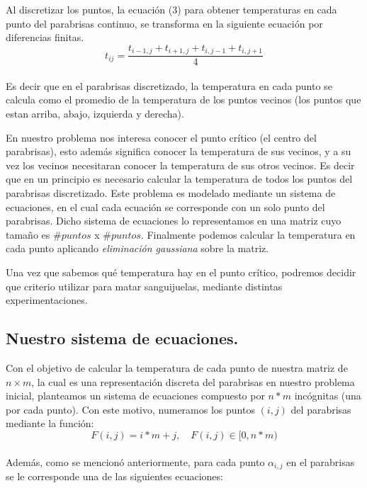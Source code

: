 \documentclass{article}
\begin{document}
Al discretizar los puntos, la ecuación (3) para obtener temperaturas en cada punto del parabrisas continuo, se transforma en la siguiente ecuación por diferencias finitas.
\begin{equation}
t_{ij} = \frac{t_{i-1,j} + t_{i+1,j} + t_{i,j-1} + t_{i,j+1}}{4}
\end{equation}\\
Es decir que en el parabrisas discretizado, la temperatura en cada punto se calcula como el promedio de la temperatura de los puntos vecinos (los puntos que estan arriba, abajo, izquierda y derecha).


En nuestro problema nos interesa conocer el punto crítico (el centro del parabrisas), esto además significa conocer la temperatura de sus vecinos, y a su vez los vecinos necesitaran conocer la temperatura de sus otros vecinos.
Es decir que en un principio es necesario calcular la temperatura de todos los puntos del parabrisas discretizado.
Este problema es modelado mediante un sistema de ecuaciones, en el cual cada ecuación se corresponde con un solo punto del parabrisas. Dicho sistema de ecuaciones lo representamos en una matriz cuyo tamaño es $\#puntos$ x $\#puntos$. Finalmente podemos calcular la temperatura en cada punto aplicando \textit{eliminación gaussiana} sobre la matriz.

Una vez que sabemos qué temperatura hay en el punto crítico, podremos decidir que criterio utilizar para matar sanguijuelas, mediante distintas experimentaciones.


\subsection{Nuestro sistema de ecuaciones.}

Con el objetivo de calcular la temperatura de cada punto de nuestra matriz de $n\times m$, la cual es una representación discreta del parabrisas en nuestro problema inicial, planteamos un sistema de ecuaciones compuesto por $n*m$ incógnitas (una por cada punto). Con este motivo, numeramos los puntos $(i,j)$ del parabrisas mediante la función:\\

\begin{equation}
	F(i, j) = i*m + j, \quad F(i,j) \in [0, n*m)
\end{equation}\\

Además, como se mencionó anteriormente, para cada punto $\alpha_{i,j}$ en el parabrisas se le corresponde una de las siguientes ecuaciones:
\end{document}
